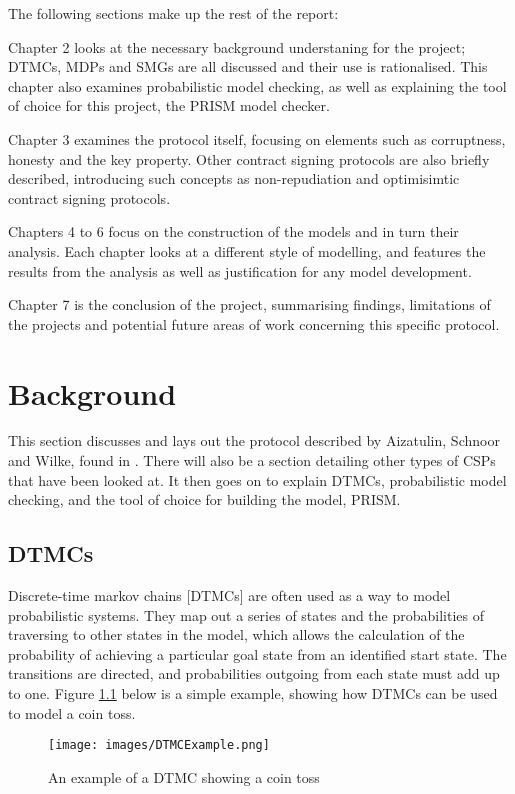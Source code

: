 \documentclass{l4proj}
\begin{document}
The following sections make up the rest of the report:

Chapter 2 looks at the necessary background understaning for the project; DTMCs, MDPs and SMGs are all discussed and their use is rationalised. This chapter also examines probabilistic model checking, as well as explaining the tool of choice for this project, the PRISM model checker.

Chapter 3 examines the protocol itself, focusing on elements such as corruptness, honesty and the key property. Other contract signing protocols are also briefly described, introducing such concepts as non-repudiation and optimisimtic contract signing protocols.

Chapters 4 to 6 focus on the construction of the models and in turn their analysis. Each chapter looks at a different style of modelling, and features the results from the analysis as well as justification for any model development.

Chapter 7 is the conclusion of the project, summarising findings, limitations of the projects and potential future areas of work concerning this specific protocol.

\chapter{Background}
This section discusses and lays out the protocol described by Aizatulin, Schnoor and Wilke, found in \cite{ASW09}. There will also be a section detailing other types of CSPs that have been looked at. It then goes on to explain DTMCs, probabilistic model checking, and the tool of choice for building the model, PRISM.

\section{DTMCs}
Discrete-time markov chains [DTMCs] are often used as a way to model probabilistic systems. They map out a series of states and the probabilities of traversing to other states in the model, which allows the calculation of the probability of achieving a particular goal state from an identified start state. The transitions are directed, and probabilities outgoing from each state must add up to one. Figure \ref{dtmc} below is a simple example, showing how DTMCs can be used to model a coin toss.

\begin{figure}[ht!]
\centering
\texttt{[image: images/DTMCExample.png]}
\caption{An example of a DTMC showing a coin toss}
\label{dtmc}
\end{figure}
\end{document}
